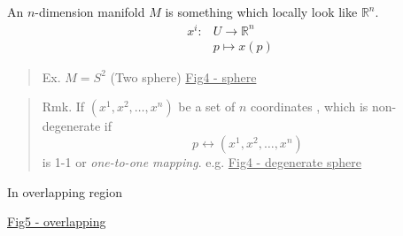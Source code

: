 An $n$-dimension manifold $M$ is something which locally look like $\mathbb{R}^n$.
\begin{equation}
\begin{aligned}
x^{i} :
&U \to \mathbb{R}^n\\
&p \mapsto  x(p)
\end{aligned}
\end{equation}


\begin{quote}
	Ex.
$M = S^2$ (Two sphere)
\underline{Fig4 - sphere}
\end{quote}

\begin{quote}
	Rmk.
If $(x^{1},x^{2},\ldots,x^{n})$ be a set of $n$ coordinates , which is non-degenerate if
\begin{equation}
p \longleftrightarrow (x^{1},x^{2},\ldots,x^{n})
\end{equation}
is 1-1 or \textit{one-to-one mapping}.
e.g.
\underline{Fig4 - degenerate sphere}
\end{quote}

In overlapping region

\underline{Fig5 - overlapping}


